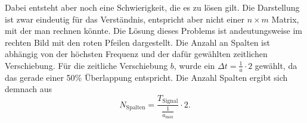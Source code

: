 Dabei entsteht aber noch eine Schwierigkeit, die es zu lösen gilt.
Die Darstellung ist zwar eindeutig für das Verständnis, entspricht
aber nicht einer $n \times m$ Matrix, mit der man rechnen könnte.
Die Lösung dieses Problems ist andeutungsweise im rechten Bild mit
den roten Pfeilen dargestellt.
Die Anzahl an Spalten ist abhängig von der höchsten Frequenz und
der dafür gewählten zeitlichen Verschiebung.
Für die zeitliche Verschiebung $b$, wurde ein $\Delta t=\frac{1}{a}\cdot2$
gewählt, da das gerade einer 50\% Überlappung entspricht.
Die Anzahl Spalten ergibt sich demnach aus
\begin{equation}
	N_\text{Spalten}=\frac{T_\text{Signal}}{\frac{1}{a_\text{max}}}\cdot2.
	\label{wavelets:equation7}
\end{equation}


